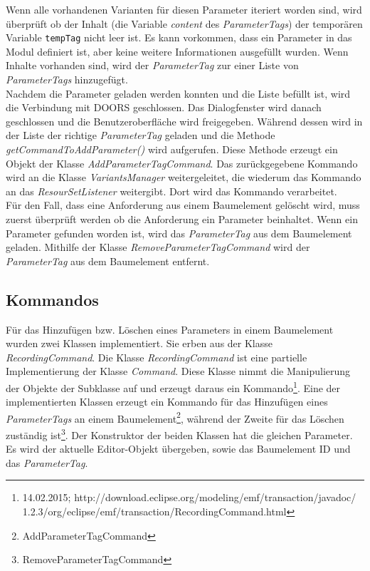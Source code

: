 Wenn alle vorhandenen Varianten für diesen Parameter iteriert worden sind, wird überprüft ob der Inhalt (die Variable \textit{content} des \textit{ParameterTags}) der temporären Variable \texttt{tempTag} nicht leer ist. Es kann vorkommen, dass ein Parameter in das Modul definiert ist, aber keine weitere Informationen ausgefüllt wurden. Wenn Inhalte vorhanden sind, wird der \textit{ParameterTag} zur einer Liste von \textit{ParameterTags} hinzugefügt.\\

Nachdem die Parameter geladen werden konnten und die Liste befüllt ist, wird die Verbindung mit DOORS geschlossen. Das Dialogfenster wird danach geschlossen und die Benutzeroberfläche wird freigegeben. Während dessen wird in der Liste der richtige \textit{ParameterTag} geladen und die Methode \textit{getCommandToAddParameter()} wird aufgerufen. Diese Methode erzeugt ein Objekt der Klasse \textit{AddParameterTagCommand}. Das zurückgegebene Kommando wird an die Klasse \textit{VariantsManager} weitergeleitet, die wiederum das Kommando an das \textit{ResourSetListener} weitergibt. Dort wird das Kommando verarbeitet.\\


Für den Fall, dass eine Anforderung aus einem Baumelement gelöscht wird, muss zuerst überprüft werden ob die Anforderung ein Parameter beinhaltet. Wenn ein Parameter gefunden worden ist, wird das \textit{ParameterTag} aus dem Baumelement geladen. Mithilfe der Klasse \textit{RemoveParameterTagCommand} wird der \textit{ParameterTag} aus dem Baumelement entfernt.

\subsection{Kommandos}\label{sub.Command}
Für das Hinzufügen bzw. Löschen eines Parameters in einem Baumelement wurden zwei Klassen implementiert. Sie erben aus der Klasse \textit{RecordingCommand}. Die Klasse \textit{RecordingCommand} ist eine partielle Implementierung der Klasse \textit{Command}. Diese Klasse nimmt die  Manipulierung der Objekte der Subklasse auf und erzeugt daraus ein Kommando\footnote{14.02.2015; http://download.eclipse.org/modeling/emf/transaction/javadoc/ 1.2.3/org/eclipse/emf/transaction/RecordingCommand.html}. Eine der implementierten Klassen erzeugt ein Kommando für das Hinzufügen eines \textit{ParameterTags} an einem Baumelement\footnote{AddParameterTagCommand}, während der Zweite für das Löschen zuständig ist\footnote{RemoveParameterTagCommand}. Der Konstruktor der beiden Klassen hat die gleichen Parameter. Es wird der aktuelle Editor-Objekt übergeben, sowie das Baumelement ID und das \textit{ParameterTag}.\\


